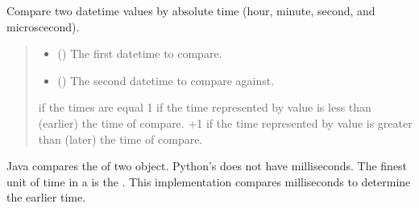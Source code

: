 \documentclass[letterpaper,10pt,english]{sphinxmanual}
\begin{document}
\begin{fulllineitems}
\begin{fulllineitems}
\label{\detokenize{apache_commons_validator_python.routines:apache_commons_validator_python.routines.time_validator.TimeValidator.compare_time}}
\pysigstartsignatures
{}
\pysigstopsignatures
\sphinxAtStartPar
Compare two datetime values by absolute time (hour, minute, second, and
microscecond).
\begin{quote}\begin{description}
\begin{itemize}
\item {} 
\sphinxAtStartPar
{} () \textendash{} The first datetime to compare.

\item {} 
\sphinxAtStartPar
{} () \textendash{} The second datetime to compare against.

\end{itemize}

 if the times are equal
\sphinxhyphen{}1 if the time represented by value is less than (earlier) the time of compare.
+1 if the time represented by value is greater than (later) the time of compare.

\end{description}\end{quote}
\begin{description}
\sphinxAtStartPar
Java compares the  of two  object.
Python’s  does not have milliseconds.
The finest unit of time in a  is the .
This implementation compares milliseconds to determine the earlier time.

\end{description}

\end{fulllineitems}



\end{fulllineitems}
\end{document}
